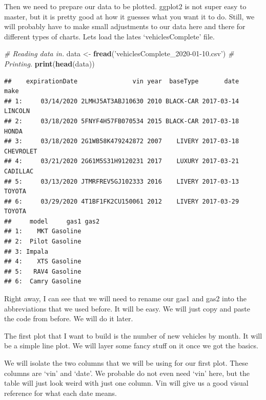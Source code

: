 \documentclass[]{book}
\newenvironment{Shaded}{\begin{snugshade}}{\end{snugshade}}
\newcommand{\CommentTok}[1]{\textcolor[rgb]{0.56,0.35,0.01}{\textit{#1}}}
\newcommand{\KeywordTok}[1]{\textcolor[rgb]{0.13,0.29,0.53}{\textbf{#1}}}
\newcommand{\NormalTok}[1]{#1}
\newcommand{\OperatorTok}[1]{\textcolor[rgb]{0.81,0.36,0.00}{\textbf{#1}}}
\newcommand{\StringTok}[1]{\textcolor[rgb]{0.31,0.60,0.02}{#1}}
\begin{document}
Then we need to prepare our data to be plotted. ggplot2 is not super easy to master, but it is pretty good at how it guesses what you want it to do. Still, we will probably have to make small adjustments to our data here and there for different types of charts. Lets load the lates `vehiclesComplete' file.

\begin{Shaded}
\begin{Highlighting}[]
\CommentTok{# Reading data in.}
\NormalTok{data <-}\StringTok{ }\KeywordTok{fread}\NormalTok{(}\StringTok{'vehiclesComplete_2020-01-10.csv'}\NormalTok{)}
\CommentTok{# Printing.}
\KeywordTok{print}\NormalTok{(}\KeywordTok{head}\NormalTok{(data))}
\end{Highlighting}
\end{Shaded}

\begin{verbatim}
##    expirationDate               vin year  baseType       date      make
## 1:     03/14/2020 2LMHJ5AT3ABJ10630 2010 BLACK-CAR 2017-03-14   LINCOLN
## 2:     03/18/2020 5FNYF4H57FB070534 2015 BLACK-CAR 2017-03-18     HONDA
## 3:     03/18/2020 2G1WB58K479242872 2007    LIVERY 2017-03-18 CHEVROLET
## 4:     03/21/2020 2G61M5S31H9120231 2017    LUXURY 2017-03-21  CADILLAC
## 5:     03/13/2020 JTMRFREV5GJ102333 2016    LIVERY 2017-03-13    TOYOTA
## 6:     03/29/2020 4T1BF1FK2CU150061 2012    LIVERY 2017-03-29    TOYOTA
##     model     gas1 gas2
## 1:    MKT Gasoline     
## 2:  Pilot Gasoline     
## 3: Impala              
## 4:    XTS Gasoline     
## 5:   RAV4 Gasoline     
## 6:  Camry Gasoline
\end{verbatim}

Right away, I can see that we will need to rename our gas1 and gas2 into the abbreviations that we used before. It will be easy. We will just copy and paste the code from before. We will do it later.

The first plot that I want to build is the number of new vehicles by month. It will be a simple line plot. We will layer some fancy stuff on it once we got the basics.

We will isolate the two columns that we will be using for our first plot. These columns are `vin' and `date'. We probable do not even need `vin' here, but the table will just look weird with just one column. Vin will give us a good visual reference for what each date means.

\begin{Shaded}
\end{Shaded}
\end{document}
